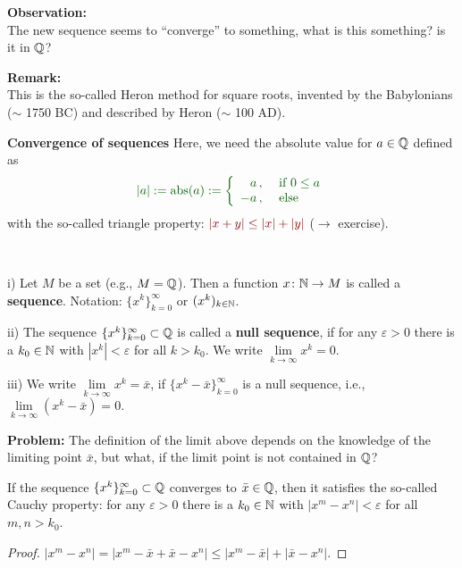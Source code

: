 {\begin{itemize}
\begin{frame}
\vspace{0.15cm}
\textbf{Observation:}\\ The new sequence seems to ``converge'' to something, what is this something? is it in ${\mathbb{Q}}$? 

\textbf{Remark:}\\This is the so-called {\sc Heron} method for square roots, invented by the Babylonians ($\sim$ 1750 BC) and described by Heron ($\sim$ 100 AD).
\end{frame}


\begin{frame} 
\textbf{Convergence of sequences}
\vspace{-0.4cm}
Here, we need the absolute value for $a\in{\mathbb{Q}}$ defined as 
$$ \color{defgruen}
|a|:=\text{abs}(a):=\left\{
\begin{array}{rl}
a\, ,&\text{ if }0\le a\\
-a\, ,&\text{ else}
\end{array}
\right.
$$
with the so-called triangle property: $\color{satzrot}|x+y|\le|x|+|y|$ ($\rightarrow$ exercise).

\begin{defi}~\\[-2pt]
	\ite
	\item[i)] Let $M$ be a set (e.g., $M = {\mathbb{Q}}$). Then a function $x\colon {\mathbb{N}} \to M$ is called a \textbf{sequence}. Notation: $\{x^k\}_{k=0}^\infty$ or $(x^k)_{k\in {\mathbb{N}}}$.
	\item[ii)] The sequence  $\{x^k\}_{k=0}^\infty\subset{\mathbb{Q}}$ is called a \textbf{null sequence}, if for any $\varepsilon>0$ there is a $k_0\in{\mathbb{N}}$ with
	$|x^k|<\varepsilon$ for all $k>k_0$. We write $\lim\limits_{k\to\infty}x^k=0$.
	\item[iii)] We write $\lim\limits_{k\to\infty}x^k=\bar{x}$, if 
	$\{x^k-\bar{x}\}_{k=0}^\infty$ is a null sequence, i.e., 
	$\lim\limits_{k\to\infty}(x^k-\bar{x})=0$.
	\eti
\end{defi}

\textbf{Problem:} The definition of the limit above depends on the knowledge of the limiting point $\bar{x}$, but what, if the limit point is not contained in ${\mathbb{Q}}$?

\begin{theo}
	If the sequence  $\{x^k\}_{k=0}^\infty\subset{\mathbb{Q}}$ converges to $\bar{x}\in{\mathbb{Q}}$, then it satisfies the so-called {\sc Cauchy} property:
	for any $\varepsilon>0$ there is a $k_0\in{\mathbb{N}}$ with
	$|x^m-x^n|<\varepsilon$ for all $m,n>k_0$.
\end{theo}
\begin{proof}$|x^m-x^n|=|x^m-\bar{x}+\bar{x}-x^n|\le |x^m-\bar{x}|+|\bar{x}-x^n|$.
\end{proof}
\end{frame}



\end{itemize}}
